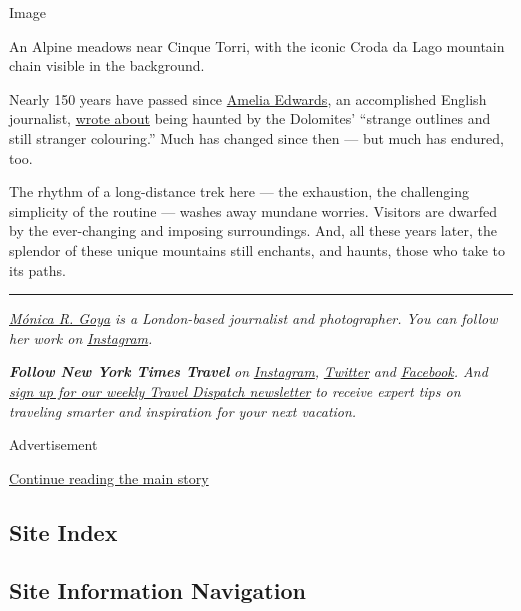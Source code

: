 Image

An Alpine meadows near Cinque Torri, with the iconic Croda da Lago
mountain chain visible in the background.

Nearly 150 years have passed since
\href{https://www.nytimes.com/2019/11/11/travel/Egypt-Nile-cruise-women.html}{Amelia
Edwards}, an accomplished English journalist,
\href{https://www.google.com/books/edition/Untrodden_Peaks_and_Unfrequented_Valleys/ECFZAAAAcAAJ?hl=en\&gbpv=1\&dq=amelia\%20edwards\%20untrodden\&pg=PA20\&printsec=frontcover}{wrote
about} being haunted by the Dolomites' ``strange outlines and still
stranger colouring.'' Much has changed since then --- but much has
endured, too.

The rhythm of a long-distance trek here --- the exhaustion, the
challenging simplicity of the routine --- washes away mundane worries.
Visitors are dwarfed by the ever-changing and imposing surroundings.
And, all these years later, the splendor of these unique mountains still
enchants, and haunts, those who take to its paths.

\begin{center}\rule{0.5\linewidth}{\linethickness}\end{center}

\href{http://www.monicargoya.com/}{\emph{Mónica R. Goya}} \emph{is a
London-based journalist and photographer. You can follow her work on}
\href{https://www.instagram.com/monicargoya/}{\emph{Instagram}}\emph{.}

\emph{\textbf{Follow New York Times Travel}} \emph{on}
\href{https://www.instagram.com/nytimestravel/}{\emph{Instagram}}\emph{,}
\href{https://twitter.com/nytimestravel}{\emph{Twitter}} \emph{and}
\href{https://www.facebook.com/nytimestravel/}{\emph{Facebook}}\emph{.
And}
\href{https://www.nytimes.com/newsletters/traveldispatch}{\emph{sign up
for our weekly Travel Dispatch newsletter}} \emph{to receive expert tips
on traveling smarter and inspiration for your next vacation.}

Advertisement

\protect\hyperlink{after-bottom}{Continue reading the main story}

\hypertarget{site-index}{%
\subsection{Site Index}\label{site-index}}

\hypertarget{site-information-navigation}{%
\subsection{Site Information
Navigation}\label{site-information-navigation}}

